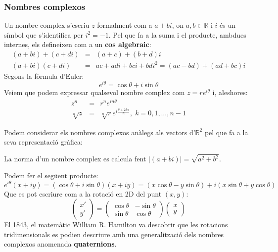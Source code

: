 \documentclass{beamer}
\begin{document}
\begin{frame}
  \frametitle{Nombres complexos}
  Un nombre complex s'escriu $z$ formalment com a $a+bi$, on $a,b \in \mathbb{R}$ i $i$ és un símbol que s'identifica per $i^2=-1$.
  Pel que fa a la suma i el producte, ambdues internes, els defineixen com a un {\bf cos algebraic}:
  \begin{eqnarray*}
    (a+bi)+(c+di)&=&(a+c)+(b+d)i\\
    (a+bi)(c+di)&=&ac+adi+bci+bdi^2=(ac-bd)+(ad+bc)i
  \end{eqnarray*}
  Segons la fòrmula d'Euler:
  \[
    e^{i\theta} = \cos{\theta}+i\sin{\theta}
  \]
  Veiem que podem expressar qualsevol nombre complex com $z=re^{i\theta}$ i, aleshores:
  \begin{eqnarray*}
    z^n&=&r^ne^{in\theta}\\
    \sqrt[n]{z}&=&\sqrt[n]{r}e^{i \frac{\theta+2k\pi}{n}}, \; k=0,1,\ldots,n-1
  \end{eqnarray*}
\end{frame}

\begin{frame}
  Podem considerar els nombres complexos anàlegs als vectors d'$\mathbb{R}^2$ pel que fa a la seva representació gràfica:

  \begin{center}
  \end{center}
\end{frame}

\begin{frame}
  La norma d'un nombre complex es calcula fent $|(a+bi)|=\sqrt{a^2+b^2}$.

  Podem fer el següent producte:
  \[
    e^{i\theta}(x+iy)= (\cos{\theta}+i\sin{\theta})(x+iy)=(x\cos{\theta}-y\sin{\theta})+i(x\sin{\theta}+y\cos{\theta})
  \]
  Que es pot escriure com a la rotació en 2D del punt $(x,y)
  $:
  \[
    \begin{pmatrix}x'\\y'\end{pmatrix}=
    \begin{pmatrix}\cos{\theta}&-\sin{\theta}\\\sin{\theta}&\cos{\theta}\end{pmatrix}
    \begin{pmatrix}x\\y\end{pmatrix}
  \]
  El 1843, el matemàtic William R. Hamilton va descobrir que les rotacions tridimensionals es podien descriure amb una generalització dels nombres complexos anomenada {\bf quaternions}.
\end{frame}
\end{document}
